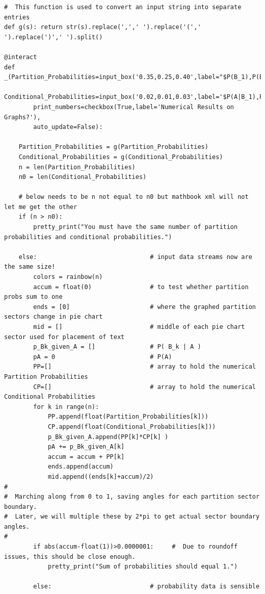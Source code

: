 \documentclass[10pt,]{book}
\theoremstyle{plain}
\theoremstyle{definition}
\theoremstyle{definition}
\numberwithin{equation}{section}
\begin{document}
\begin{lstlisting}[style=sageinput]
#  This function is used to convert an input string into separate entries
def g(s): return str(s).replace(',',' ').replace('(',' ').replace(')',' ').split()

@interact
def _(Partition_Probabilities=input_box('0.35,0.25,0.40',label="$P(B_1),P(B_2),...$"),
        Conditional_Probabilities=input_box('0.02,0.01,0.03',label='$P(A|B_1),P(A|B_2),...$'),
        print_numbers=checkbox(True,label='Numerical Results on Graphs?'),
        auto_update=False):
            
    Partition_Probabilities = g(Partition_Probabilities)
    Conditional_Probabilities = g(Conditional_Probabilities)
    n = len(Partition_Probabilities)
    n0 = len(Conditional_Probabilities)
    
    # below needs to be n not equal to n0 but mathbook xml will not let me get the other
    if (n > n0):
        pretty_print("You must have the same number of partition probabilities and conditional probabilities.")
        
    else:                               # input data streams now are the same size!
        colors = rainbow(n)
        accum = float(0)                # to test whether partition probs sum to one
        ends = [0]                      # where the graphed partition sectors change in pie chart 
        mid = []                        # middle of each pie chart sector used for placement of text
        p_Bk_given_A = []               # P( B_k | A )
        pA = 0                          # P(A)
        PP=[]                           # array to hold the numerical Partition Probabilities 
        CP=[]                           # array to hold the numerical Conditional Probabilities     
        for k in range(n):
            PP.append(float(Partition_Probabilities[k]))
            CP.append(float(Conditional_Probabilities[k]))    
            p_Bk_given_A.append(PP[k]*CP[k] )
            pA += p_Bk_given_A[k]
            accum = accum + PP[k]
            ends.append(accum)
            mid.append((ends[k]+accum)/2)
#
#  Marching along from 0 to 1, saving angles for each partition sector boundary.
#  Later, we will multiple these by 2*pi to get actual sector boundary angles.
#
        if abs(accum-float(1))>0.0000001:     #  Due to roundoff issues, this should be close enough.                     
            pretty_print("Sum of probabilities should equal 1.")
        
        else:                           # probability data is sensible
 

\end{lstlisting}
\end{document}
